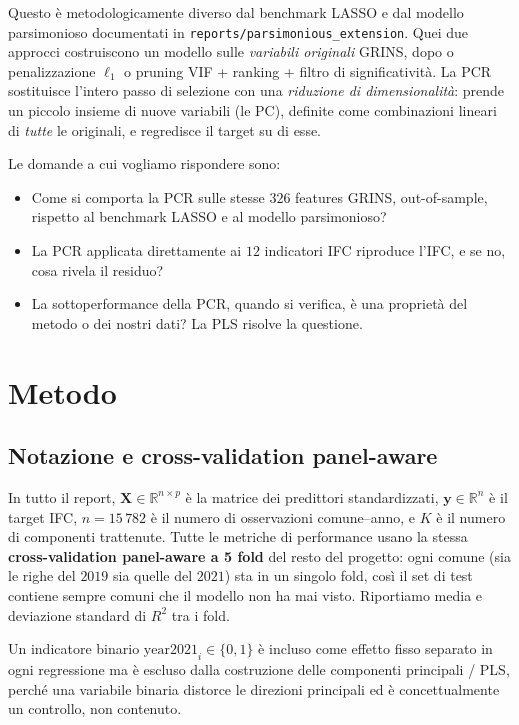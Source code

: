 \documentclass[11pt,a4paper]{article}
\begin{document}
Questo è metodologicamente diverso dal benchmark LASSO e dal
modello parsimonioso documentati in
\verb|reports/parsimonious_extension|. Quei due approcci
costruiscono un modello sulle \emph{variabili originali} GRINS,
dopo o penalizzazione \(\ell_{1}\) o pruning VIF + ranking +
filtro di significatività. La PCR sostituisce l'intero passo di
selezione con una \emph{riduzione di dimensionalità}: prende un
piccolo insieme di nuove variabili (le PC), definite come
combinazioni lineari di \emph{tutte} le originali, e regredisce
il target su di esse.

Le domande a cui vogliamo rispondere sono:
\begin{itemize}[leftmargin=2em]
  \item Come si comporta la PCR sulle stesse \(326\) features
    GRINS, out-of-sample, rispetto al benchmark LASSO e al modello
    parsimonioso?
  \item La PCR applicata direttamente ai \(12\) indicatori IFC
    riproduce l'IFC, e se no, cosa rivela il residuo?
  \item La sottoperformance della PCR, quando si verifica, è una
    proprietà del metodo o dei nostri dati? La PLS risolve la
    questione.
\end{itemize}

\section{Metodo}

\subsection{Notazione e cross-validation panel-aware}

In tutto il report, \(\mathbf{X}\in\mathbb{R}^{n\times p}\) è la
matrice dei predittori standardizzati, \(\mathbf{y}\in\mathbb{R}^{n}\)
è il target IFC, \(n = 15\,782\) è il numero di osservazioni
comune--anno, e \(K\) è il numero di componenti trattenute. Tutte
le metriche di performance usano la stessa
\textbf{cross-validation panel-aware a 5 fold} del resto del
progetto: ogni comune (sia le righe del \(2019\) sia quelle del
\(2021\)) sta in un singolo fold, così il set di test contiene
sempre comuni che il modello non ha mai visto. Riportiamo media e
deviazione standard di \(R^{2}\) tra i fold.

Un indicatore binario \(\mathrm{year2021}_i\in\{0,1\}\) è incluso
come effetto fisso separato in ogni regressione ma è escluso dalla
costruzione delle componenti principali / PLS, perché una
variabile binaria distorce le direzioni principali ed è
concettualmente un controllo, non contenuto.
\end{document}
